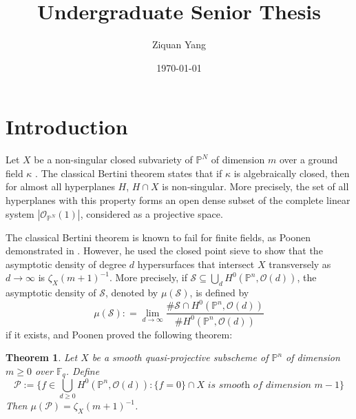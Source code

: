 \documentclass[12pt]{article}
\theoremstyle{plain}
\newtheorem{theorem}[equation]{Theorem}
\theoremstyle{definition}
\newcommand{\IF}{\mathbb{F}}
\newcommand{\IP}{\mathbb{P}}
\newcommand{\sO}{\mathcal{O}}
\newcommand{\sP}{\mathcal{P}}
\newcommand{\sS}{\mathcal{S}}
\newcommand\union{\bigcup}
\newcommand{\<}{\langle}
\renewcommand{\>}{\rangle}
\begin{document}
%
\title{Undergraduate Senior Thesis}
\author{Ziquan Yang}
\date{\today}

\maketitle

\tableofcontents

\section{Introduction}
Let $X$ be a non-singular closed subvariety of $\IP^N$ of dimension $m$ over a ground field $\kappa$ . The classical Bertini theorem states that if $\kappa$ is algebraically closed, then for almost all hyperplanes $H$, $H \cap X$ is non-singular. More precisely, the set of all hyperplanes with this property forms an open dense subset of the complete linear system $|\sO_{\IP^N}(1)|$, considered as a projective space.  

The classical Bertini theorem is known to fail for finite fields, as Poonen demonstrated in \cite{Poonen}. However, he used the closed point sieve to show that the asymptotic density of degree $d$ hypersurfaces that intersect $X$ transversely as $d \to \infty$ is $\zeta_{X}(m + 1)^{-1}$. More precisely, if $\sS \subseteq \union_d H^0(\IP^n, \sO(d))$, the asymptotic density of $\sS$, denoted by $\mu(\sS)$, is defined by 
$$ \mu(\sS) : = \lim_{d \to \infty} \frac{\# \sS \cap H^0(\IP^n, \sO(d))}{\# H^0(\IP^n, \sO(d))}$$
if it exists, and Poonen proved the following theorem:
\begin{theorem}
Let $X$ be a smooth quasi-projective subscheme of $\IP^n$ of dimension $m \ge 0$ over $\IF_q$. Define 
$$ \sP := \{ f \in \union_{d \ge 0} H^0(\IP^n, \sO(d)) : \{ f = 0 \} \cap X \textit{ is smooth of dimension } m - 1 \}$$
Then $\mu(\sP) = \zeta_X(m + 1)^{-1}$. 
\end{theorem}
\end{document}
